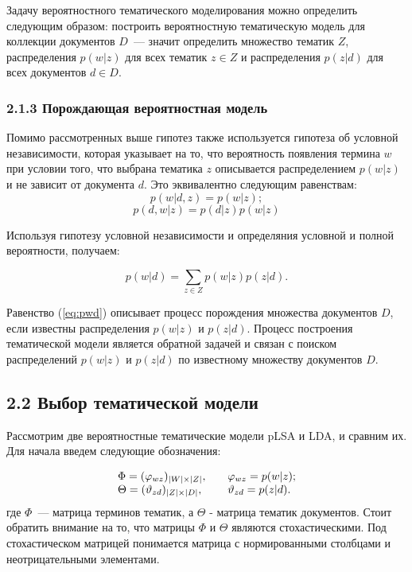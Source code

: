 \documentclass[a4paper]{report}
\begin{document}
	Задачу вероятностного тематического моделирования можно определить следующим образом: построить вероятностную тематическую модель для коллекции документов $D$~--- значит определить множество тематик $Z$, распределения $p(w|z)$ для всех тематик $z \in Z$ и распределения $p(z|d)$ для всех документов $d \in D$.
	
	\subsubsection{2.1.3 Порождающая вероятностная модель}

	Помимо рассмотренных выше гипотез также используется гипотеза об условной независимости, которая указывает на то, что вероятность появления термина $w$ при	условии того, что выбрана тематика $z$ описывается распределением $p(w|z)$ и не зависит от документа $d$. Это эквивалентно следующим равенствам:
			$$ p(w|d,z) = p(w|z); $$
			$$ p(d,w|z) = p(d|z)p(w|z) $$

	Используя гипотезу условной независимости и определяния условной и полной вероятности, получаем:
	
	\begin{equation}
		p(w|d) = \sum_{z \in Z} p(w|z)p(z|d).
	\label{eq:pwd}
	\end{equation}
	
	Равенство (\ref{eq:pwd}) описывает процесс порождения множества документов $D$, если известны распределения $p(w|z)$ и  $p(z|d)$. Процесс построения тематической модели является обратной задачей и связан с поиском распределений $p(w|z)$ и  $p(z|d)$ по известному множеству документов $D$.
	
	\subsection{2.2 Выбор тематической модели}
	
	Рассмотрим две вероятностные тематические модели pLSA и LDA, и сравним их. 
	Для начала введем следующие обозначения:
	
	$$
	\begin{array}{l l}
			
	\Phi = (\varphi_{wz})_{|W| \times |Z|}, & \quad \varphi_{wz} = p(w|z); \\
			\Theta = (\vartheta_{zd})_{|Z| \times |D|}, &  \quad
				\vartheta_{zd} = p(z|d). 
		\end{array}$$
	где $\Phi$~--- матрица терминов тематик, а $\Theta$ - матрица тематик документов. Стоит обратить внимание на то, что матрицы $\Phi$ и $\Theta$ являются стохастическими. Под стохастическом матрицей понимается матрица с нормированными столбцами и неотрицательными элементами.
	
\end{document}
